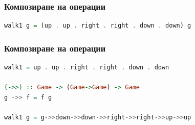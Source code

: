 \documentclass{beamer}
\begin{document}
\begin{frame}[fragile]
  \frametitle{Композиране на операции}

\begin{lstlisting}[basicstyle=\small,language=Haskell]
walk1 g = (up . up . right . right . down . down) g
\end{lstlisting}



\end{frame}


\begin{frame}[fragile]
  \frametitle{Композиране на операции}

\bigskip
\bigskip
\bigskip
\bigskip
\bigskip

\begin{lstlisting}[basicstyle=\small,language=Haskell]
walk1 = up . up . right . right . down . down

(->>) :: Game -> (Game->Game) -> Game
g ->> f = f g

walk1 g = g->>down->>down->>right->>right->>up->>up
\end{lstlisting}


\end{frame}
\end{document}
